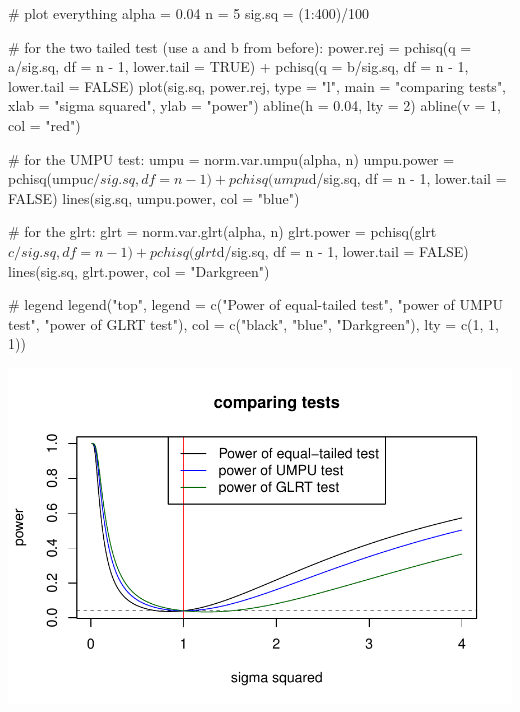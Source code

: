\documentclass[12pt, a4paper]{article}\usepackage[]{graphicx}\usepackage[]{color}
\makeatletter
\def\maxwidth{ %
  \ifdim\Gin@nat@width>\linewidth
    \linewidth
  \else
    \Gin@nat@width
  \fi
}
\makeatother
\begin{document}
\begin{enumerate}[label = {\bfseries\arabic*.}]
{\begin{Schunk}
\begin{Sinput}
# plot everything
alpha = 0.04
n = 5
sig.sq = (1:400)/100

# for the two tailed test (use a and b from before):
power.rej = pchisq(q = a/sig.sq, df = n - 1, lower.tail = TRUE) + pchisq(q = b/sig.sq, df = n - 1, lower.tail = FALSE)
plot(sig.sq, power.rej, type = "l", main = "comparing tests", xlab = "sigma squared", ylab = "power")
abline(h = 0.04, lty = 2)
abline(v = 1, col = "red")

# for the UMPU test:
umpu = norm.var.umpu(alpha, n)
umpu.power = pchisq(umpu$c/sig.sq, df = n - 1) + pchisq(umpu$d/sig.sq, df = n - 1, lower.tail = FALSE)
lines(sig.sq, umpu.power, col = "blue")

# for the glrt:
glrt = norm.var.glrt(alpha, n)
glrt.power = pchisq(glrt$c/sig.sq, df = n - 1) + pchisq(glrt$d/sig.sq, df = n - 1, lower.tail = FALSE)
lines(sig.sq, glrt.power, col = "Darkgreen")

# legend
legend("top", legend = c("Power of equal-tailed test", "power of UMPU test", "power of GLRT test"), col = c("black",
    "blue", "Darkgreen"), lty = c(1, 1, 1))
\end{Sinput}


{\centering \includegraphics[width=\maxwidth]{figure/unnamed-chunk-9-1} 

}

\end{Schunk}
  
  
  }
\end{enumerate}
\end{document}
